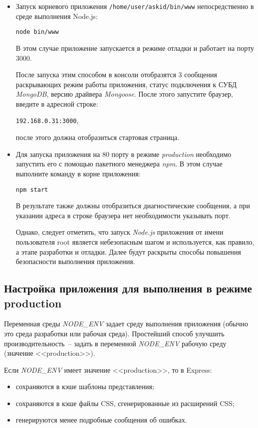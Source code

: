 	\begin{itemize}
		\item Запуск корневого приложения \verb|/home/user/askid/bin/www| непосредст\-венно в среде выполнения Node.js:
		
			\verb|node bin/www|
			
		В этом случае приложение запускается в режиме отладки и работает на порту 3000.
		
		После запуска этим способом в консоли  отобразятся 3 сообщения раскрывающих режим работы приложения, статус подключения к СУБД \textit{MongoDB}, версию драйвера \textit{Mongoose}. После этого запустите браузер, введите в адресной строке:
		
		 \verb|192.168.0.31:3000|, 
		 
		 после этого должна отобразиться стартовая страница.
		
		\item Для запуска приложения на 80 порту в режиме \textit{production} необходимо запустить его с помощью пакетного менеджера \textit{npm}. В этом случае выполните команду в корне приложения:
		
			\verb|npm start|
			
		В результате также должны отобразиться диагностические сообщения, а при указании адреса в строке браузера нет необходимости указывать порт.
		
		Однако, следует отметить, что запуск \textit{Node.js} приложения от имени пользователя root является небезопасным шагом и используется, как правило, а этапе разработки и отладки. Далее будут раскрыты способы повышения безопасности выполнения приложения.
	\end{itemize}

	
\subsection{Настройка приложения для выполнения в режиме production}
Переменная среды \textit{NODE\_ENV} задает среду выполнения приложения (обычно это среда разработки или рабочая среда). Простейший способ улучшить производительность~-- задать в переменной \textit{NODE\_ENV} рабочую среду (значение <<production>>).

Если \textit{NODE\_ENV} имеет значение <<production>>, то в Express:

	\begin{itemize}
		\item сохраняются в кэше шаблоны представления;
		\item сохраняются в кэше файлы CSS, сгенерированные из расширений CSS;
		\item генерируются менее подробные сообщения об ошибках.
	\end{itemize}

